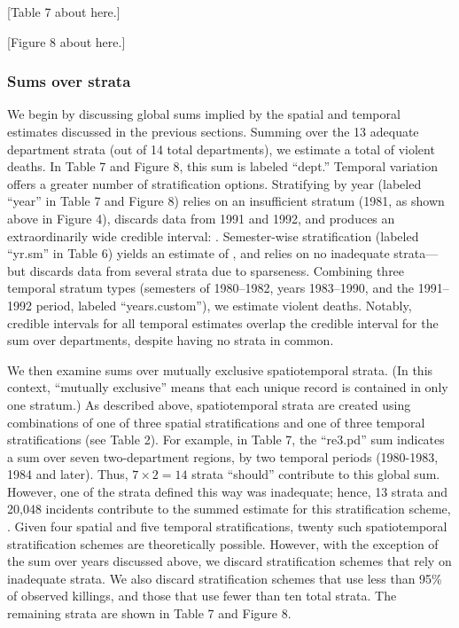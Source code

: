 \documentclass[11pt,]{article}
\begin{document}
{[}Table 7 about here.{]}

{[}Figure 8 about here.{]}

\hypertarget{sums-over-strata}{%
\subsubsection{Sums over strata}\label{sums-over-strata}}

We begin by discussing global sums implied by the spatial and temporal
estimates discussed in the previous sections. Summing over the 13
adequate department strata (out of 14 total departments), we estimate a
total of violent deaths. In Table 7 and Figure 8, this sum is labeled
``dept.'' Temporal variation offers a greater number of stratification
options. Stratifying by year (labeled ``year'' in Table 7 and Figure 8)
relies on an insufficient stratum (1981, as shown above in Figure 4),
discards data from 1991 and 1992, and produces an extraordinarily wide
credible interval: . Semester-wise stratification (labeled ``yr.sm'' in
Table 6) yields an estimate of , and relies on no inadequate
strata---but discards data from several strata due to sparseness.
Combining three temporal stratum types (semesters of 1980--1982, years
1983--1990, and the 1991--1992 period, labeled ``years.custom''), we
estimate violent deaths. Notably, credible intervals for all temporal
estimates overlap the credible interval for the sum over departments,
despite having no strata in common.

We then examine sums over mutually exclusive spatiotemporal strata. (In
this context, ``mutually exclusive'' means that each unique record is
contained in only one stratum.) As described above, spatiotemporal
strata are created using combinations of one of three spatial
stratifications and one of three temporal stratifications (see Table 2).
For example, in Table 7, the ``re3.pd'' sum indicates a sum over seven
two-department regions, by two temporal periods (1980-1983, 1984 and
later). Thus, \(7 \times 2 = 14\) strata ``should'' contribute to this
global sum. However, one of the strata defined this way was inadequate;
hence, 13 strata and 20,048 incidents contribute to the summed estimate
for this stratification scheme, . Given four spatial and five temporal
stratifications, twenty such spatiotemporal stratification schemes are
theoretically possible. However, with the exception of the sum over
years discussed above, we discard stratification schemes that rely on
inadequate strata. We also discard stratification schemes that use less
than 95\% of observed killings, and those that use fewer than ten total
strata. The remaining strata are shown in Table 7 and Figure 8.
\end{document}
